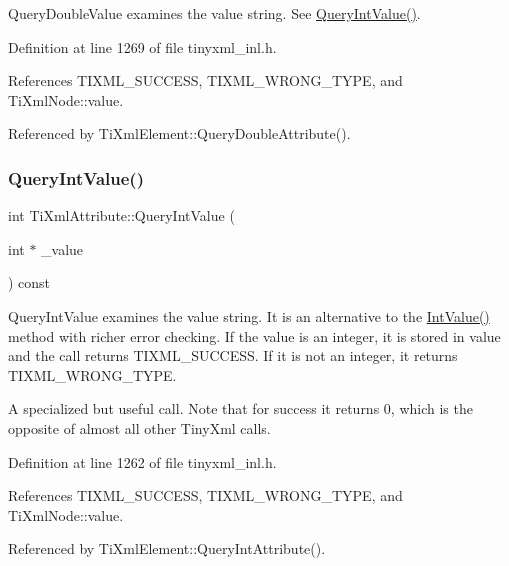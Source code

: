 Query\+Double\+Value examines the value string. See \hyperlink{class_ti_xml_attribute_a6caa8090d2fbb7966700a16e45ed33de}{Query\+Int\+Value()}. 



Definition at line 1269 of file tinyxml\+\_\+inl.\+h.



References T\+I\+X\+M\+L\+\_\+\+S\+U\+C\+C\+E\+SS, T\+I\+X\+M\+L\+\_\+\+W\+R\+O\+N\+G\+\_\+\+T\+Y\+PE, and Ti\+Xml\+Node\+::value.



Referenced by Ti\+Xml\+Element\+::\+Query\+Double\+Attribute().

\hypertarget{class_ti_xml_attribute_a6caa8090d2fbb7966700a16e45ed33de}{}\label{class_ti_xml_attribute_a6caa8090d2fbb7966700a16e45ed33de} 
\subsubsection{\texorpdfstring{Query\+Int\+Value()}{QueryIntValue()}}
{\footnotesize\ttfamily int Ti\+Xml\+Attribute\+::\+Query\+Int\+Value (\begin{DoxyParamCaption}\item[{int $\ast$}]{\+\_\+value }\end{DoxyParamCaption}) const}

Query\+Int\+Value examines the value string. It is an alternative to the \hyperlink{class_ti_xml_attribute_ac8501370b065df31a35003c81d87cef2}{Int\+Value()} method with richer error checking. If the value is an integer, it is stored in \textquotesingle{}value\textquotesingle{} and the call returns T\+I\+X\+M\+L\+\_\+\+S\+U\+C\+C\+E\+SS. If it is not an integer, it returns T\+I\+X\+M\+L\+\_\+\+W\+R\+O\+N\+G\+\_\+\+T\+Y\+PE.

A specialized but useful call. Note that for success it returns 0, which is the opposite of almost all other Tiny\+Xml calls. 

Definition at line 1262 of file tinyxml\+\_\+inl.\+h.



References T\+I\+X\+M\+L\+\_\+\+S\+U\+C\+C\+E\+SS, T\+I\+X\+M\+L\+\_\+\+W\+R\+O\+N\+G\+\_\+\+T\+Y\+PE, and Ti\+Xml\+Node\+::value.



Referenced by Ti\+Xml\+Element\+::\+Query\+Int\+Attribute().

